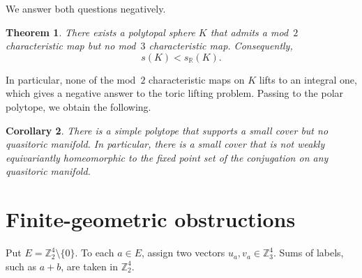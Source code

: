 \documentclass[10pt,a4paper]{amsart}
\theoremstyle{plain}
\newtheorem{theorem}{Theorem}[section]
\newtheorem{corollary}[theorem]{Corollary}
\numberwithin{equation}{section}
\theoremstyle{remark}
\theoremstyle{definition}
\newcommand{\Z}{\mathbb Z}
\newcommand{\R}{\mathbb R}
\begin{document}
We answer both questions negatively.


\begin{theorem}\label{thm:main}
    There exists a polytopal sphere $K$ that admits a mod~$2$ characteristic map but no mod~$3$ characteristic map. 
    Consequently, 
    $$
        s(K) < s_{\R}(K).
    $$
\end{theorem}


In particular, none of the mod~$2$ characteristic maps on $K$ lifts to an integral one, which gives a negative answer to the toric lifting problem. 
Passing to the polar polytope, we obtain the following.

\begin{corollary}\label{cor:polytope}
    There is a simple polytope that supports a small cover but no quasitoric manifold.
    In particular, there is a small cover that is not weakly equivariantly homeomorphic to the fixed point set of the conjugation on any quasitoric manifold.
\end{corollary}



\section{Finite-geometric obstructions} \label{sec:alg_lem}
Put $E=\Z_2^4\setminus\{0\}$.
To each $a\in E$, assign two vectors $u_a, v_a\in\Z_3^4$.
Sums of labels, such as $a+b$, are taken in $\Z_2^4$.
\end{document}
